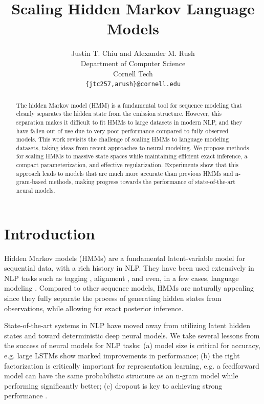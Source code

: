 \documentclass[11pt,a4paper]{article}
\title{Scaling Hidden Markov Language Models}
\author{Justin T. Chiu {\normalfont and} Alexander M. Rush\\
  Department of Computer Science \\
  Cornell Tech \\
  \texttt{\{jtc257,arush\}@cornell.edu}\\}
\date{}
\begin{document}
\maketitle
\begin{abstract}
The hidden Markov model (HMM) is a fundamental tool for sequence modeling that 
cleanly separates the hidden state from the emission structure.
However, this separation makes it difficult to fit HMMs to large datasets in modern NLP, 
and they have fallen out of use due to very poor performance 
compared to fully observed models. This work revisits the challenge of 
scaling HMMs to language modeling datasets,
taking ideas from recent approaches to neural modeling.
We propose methods for scaling HMMs to massive state spaces
while maintaining efficient exact inference, a compact parameterization,
and effective regularization.
Experiments show that this approach leads to models that are much more accurate
than previous HMMs and n-gram-based methods,
making progress towards the performance of state-of-the-art neural models.
\end{abstract}

\section{Introduction}

Hidden Markov models (HMMs) are a fundamental latent-variable model for sequential data,
with a rich history in NLP.
They have been used extensively in NLP tasks such as
tagging \citep{merialdo1994tagging}, alignment \citep{vogel1996hmm},
and even, in a few cases, language modeling \citep{kuhn1994hmmlm,huang2011thesis}. 
Compared to other sequence models, HMMs are naturally appealing since they 
fully separate the process of generating hidden states from observations,
while allowing for exact posterior inference. 

State-of-the-art systems in NLP have moved away from utilizing latent hidden states
and toward deterministic deep neural models.
We take several lessons from the success of neural models for NLP tasks:
(a) model size is critical for accuracy,
e.g. large LSTMs \cite{zaremba2014lstm} show marked improvements in performance;
(b) the right factorization is critically important for representation learning,
e.g. a feedforward model \cite{bengio2003nlm}
can have the same probabilistic structure as an n-gram model while performing significantly better;
(c) dropout is key to achieving strong performance \citep{zaremba2014lstm,merity2017awdlstm}.
\end{document}
